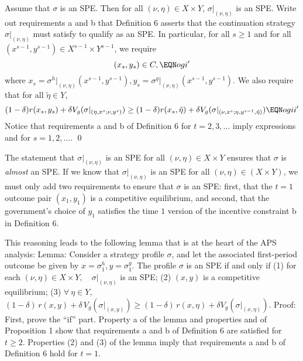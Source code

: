 \medskip\noindent
\medskip{} Assume that $\sigma$ is an SPE.
Then for all $(\nu,\eta) \in X \times Y$, $ \sigma\vert_{(\nu,\eta)}$ is
an SPE.
\medskip
{} Write out requirements a and b that Definition 6 asserts that  the continuation strategy $\sigma\vert_{(\nu,\eta)}$ must satisfy to
qualify as an SPE.  In particular,
for all $s \geq 1$ and for all $(x^{s-1},y^{s-1})
\in X^{s-1} \times Y^{s-1}$, we require
$$ (x_s, y_s) \in C , \EQN ogi' $$
where $x_s = \sigma^h\vert_{(\nu,\eta)}(x^{s-1},y^{s-1}),
y_s = \sigma^g\vert_{(\nu,\eta)}(x^{s-1},y^{s-1})$.
We also require that for all $\tilde \eta \in Y$,
$$ (1-\delta) r(x_s, y_s) + \delta V_g(\sigma\vert
       _{(\eta, x^s; \nu, y^s)})
       \geq (1-\delta) r(x_s, \tilde \eta) + \delta
       V_g(\sigma\vert_{(\nu,x^s; \eta,y^{s-1},\tilde \eta)}) \EQN ogii'$$
Notice that requirements a and b of Definition 6 for $t=2, 3, \ldots $
imply expressions  and  for $s = 1,2, \ldots $. \qed

\medskip
  The statement that
$\sigma\vert_{(\nu,\eta)}$ is an SPE for all $(\nu,\eta) \in
X \times Y$ ensures that $\sigma$ is {\it almost\/} an SPE.
If we know that $\sigma\vert_{(\nu,\eta)}$ is an SPE for
all $(\nu, \eta) \in   (X \times Y)$, we must only add  two
requirements to ensure that $\sigma$ is an SPE:
first, that
the $t=1$ outcome pair $(x_1, y_1)$ is a competitive equilibrium,
and second, that the government's choice of $y_1$ satisfies the
time $1$ version of the incentive constraint b in Definition 6.

This reasoning leads  to the following  lemma that is at the heart of the APS analysis:
\medskip\noindent
{\sc Lemma:}  Consider a strategy profile $\sigma$, and let
the associated first-period
outcome be given by $x=\sigma^h_1,y=\sigma^g_1$.  The profile $\sigma$ is
an SPE if and only if
\medskip
\noindent (1) for each $(\nu,\eta) \in X\times Y,\quad
\sigma\vert_{(\nu,\eta)}$ is an SPE;
\smallskip
\noindent (2) $(x,y)$ is a competitive equilibrium;
\smallskip
\noindent (3) $\forall\ \eta\in Y$,
$(1-\delta)\, r(x,y) + \delta\,V_g(\sigma\vert_{(x,y)})\geq (1-\delta)\,
r(x,\eta) + \delta V_g(\sigma\vert_{(x,\eta)})$.
\medskip\noindent
{\sc Proof:} First, prove the ``if'' part.  Property a of
the lemma and properties  and 
of Proposition 1 show that requirements a and b of
Definition 6 are satisfied for $t \geq 2$.  Properties (2) and
(3) of the lemma imply that requirements a and b of Definition 6
hold for $t=1$.

